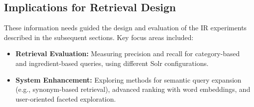 \subsection{Implications for Retrieval Design}
These information needs guided the design and evaluation of the IR experiments described in the subsequent sections. Key focus areas included:

\begin{itemize}
  \item \textbf{Retrieval Evaluation:} Measuring precision and recall for category-based and ingredient-based queries, using different Solr configurations.
  \item \textbf{System Enhancement:}  Exploring methods for semantic query expansion (e.g., synonym-based retrieval), advanced ranking with word embeddings, and user-oriented faceted exploration.
\end{itemize}




